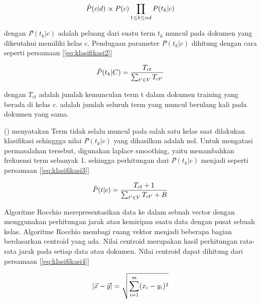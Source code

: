 \begin{equation}
	\begin{split}
		\tiny
		\hat{P}(c|d) \propto P(c) \prod_{1\leq k \leq nd}P(t_k|c)
		\label{eq:klasifikasi1}
		\normalsize
	\end{split}
\end{equation}

dengan  \textit{\^{P}}$(t_{k}|c) $ adalah peluang dari suatu term $ t_{k} $ muncul pada dokumen yang dikeutahui memiliki kelas c. Pendugaan parameter  \textit{\^{P}}$(t_{k}|c) $ dihitung dengan cara seperti persamaan [\ref{eq:klasifikasi2}]

\begin{equation}
	\begin{split}
		\tiny
		\hat{P}(t_k|C) = \frac{T_{ct}}{\sum _{t' \in V} T_{ct'}}
		\label{eq:klasifikasi2}
		\normalsize
	\end{split}
\end{equation}

dengan $ T_{ct} $ adalah jumlah kemunculan term t dalam dokumen training yang berada di kelas c.  adalah jumlah seluruh term yang muncul berulang kali pada dokumen yang sama.

\citeauthor{MANNING2008} (\cite*{MANNING2008}) menyatakan Term tidak selalu muncul pada salah satu kelas saat dilakukan klasifikasi sehinggga nilai \textit{\^{P}}$(t_{k}|c) $   yang dihasilkan adalah nol. Untuk mengatasi permasalahan tersebut, digunakan laplace smoothing, yaitu menambahkan frekuensi term sebanyak 1. sehingga perhitungan dari  \textit{\^{P}}$(t_{k}|c) $  menjadi seperti persamaan [\ref{eq:klasifikasi3}] 

\begin{equation}
	\begin{split}
		\tiny
		\hat{P}(t|c) = \frac{T_{ct} + 1}{\sum _{t' \in V} T_{ct'} + B}
		\label{eq:klasifikasi3}
		\normalsize
	\end{split}
\end{equation}

Algoritme Rocchio merepresentasikan data ke dalam sebuah vector dengan  menggunakan perhitungan jarak atau kemiripan suatu data dengan pusat sebuah kelas. Algoritme Rocchio membagi ruang vektor menjadi beberapa bagian berdasarkan centroid yang ada. Nilai centroid merupakan hasil perhitungan rata- rata jarak pada setiap data atau dokumen. Nilai centroid dapat dihitung dari persamaan [\ref{eq:klasifikasi4}] 

\begin{equation}
	\begin{split}
		\tiny
		|\vec{x}-\vec{y}| = \sqrt{\sum^{m}_{i=1}(x_{i}-y_{i})^2} 
		\label{eq:klasifikasi4}
		\normalsize
	\end{split}
\end{equation}

